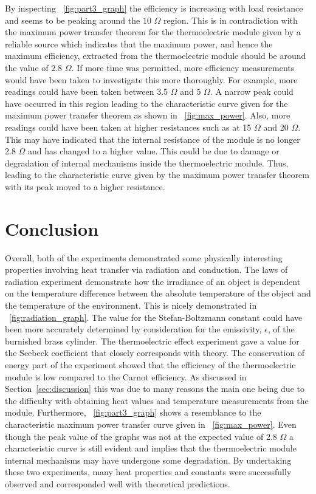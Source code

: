 \documentclass{article}
\newcommand{\figref}[2][\figurename~]{#1\ref{#2}}
\newcommand{\secref}[2][Section~]{#1\ref{#2}}
\begin{document}
\vspace{2mm}
\noindent
By inspecting \figref{fig:part3_graph} the efficiency is increasing with load resistance and seems to be peaking around the $10$ $\Omega$ region. This is in contradiction with the maximum power transfer theorem for the thermoelectric module given by a reliable source \cite{Paper02} which indicates that the maximum power, and hence the maximum efficiency, extracted from the thermoelectric module should be around the value of $2.8$ $\Omega$. If more time was permitted, more efficiency measurements would have been taken to investigate this more thoroughly. For example, more readings could have been taken between 3.5 $\Omega$ and 5 $\Omega$. A narrow peak could have occurred in this region leading to the characteristic curve given for the maximum power transfer theorem as shown in \figref{fig:max_power}. Also, more readings could have been taken at higher resistances such as at 15 $\Omega$ and 20 $\Omega$. This may have indicated that the internal resistance of the module is no longer 2.8 $\Omega$ and has changed to a higher value. This could be due to damage or degradation of internal mechanisms inside the thermoelectric module. Thus, leading to the characteristic curve given by the maximum power transfer theorem with its peak moved to a higher resistance.  

\section{Conclusion}
\label{sec:conclusion}

Overall, both of the experiments demonstrated some physically interesting properties involving heat transfer via radiation and conduction. The laws of radiation experiment demonstrate how the irradiance of an object is dependent on the temperature difference between the absolute temperature of the object and the temperature of the environment. This is nicely demonstrated in \figref{fig:radiation_graph}. The value for the Stefan-Boltzmann constant could have been more accurately determined by consideration for the emissivity, $\epsilon$, of the burnished brass cylinder. The thermoelectric effect experiment gave a value for the Seebeck coefficient that closely corresponds with theory. The conservation of energy part of the experiment showed that the efficiency of the thermoelectric module is low compared to the Carnot efficiency. As discussed in \secref{sec:discussion} this was due to many reasons the main one being due to the difficulty with obtaining heat values and temperature measurements from the module. Furthermore, \figref{fig:part3_graph} shows a resemblance to the characteristic maximum power transfer curve given in \figref{fig:max_power}. Even though the peak value of the graphs was not at the expected value of 2.8 $\Omega$ a characteristic curve is still evident and implies that the thermoelectric module internal mechanisms may have undergone some degradation. By undertaking these two experiments, many heat properties and constants were successfully observed and corresponded well with theoretical predictions.
\end{document}
